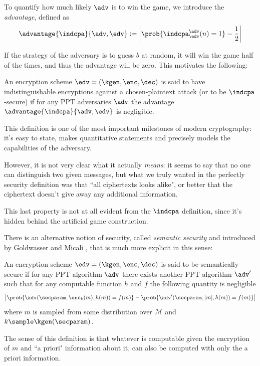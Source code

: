 To quantify how much likely $\adv$ is to win the game, we introduce the \emph{advantage}, defined as
$$\advantage{\indcpa}{\adv,\edv}:=\left| \prob{\indcpa^\adv_\edv(n)=1}-\frac12 \right|$$

If the strategy of the adversary is to guess $b$ at random, it will win the game half of the times, and thus the advantage will be zero. This motivates the following:

\begin{definition}
    An encryption scheme $\edv=(\kgen,\enc,\dec)$ is said to have indistinguishable encryptions against a chosen-plaintext attack (or to be $\indcpa$-secure) if for any PPT adversaries $\adv$ the advantage $\advantage{\indcpa}{\adv,\edv}$ is negligible.
\end{definition}

This definition is one of the most important milestones of modern cryptography: it's easy to state, makes quantitative statements and precisely models the capabilities of the adversary.

However, it is not very clear what it actually \emph{means}: it seems to say that no one can distinguish two given messages, but what we truly wanted in the perfectly security definition was that ``all ciphertexts looks alike", or better that the ciphertext doesn't give away any additional information.

This last property is not at all evident from the $\indcpa$ definition, since it's hidden behind the artificial game construction.

There is an alternative notion of security, called \emph{semantic security} and introduced by Goldwasser and Micali \cite{Goldwasser_ss}, that is much more explicit in this sense:
\begin{definition}
    An encryption scheme $\edv=(\kgen,\enc,\dec)$ is said to be semantically secure if for any PPT algorithm $\adv$ there exists another PPT algorithm $\adv'$ such that for any computable function $h$ and $f$ the following quantity is negligible
    $$\left| \prob{\adv(\secparam, \enc_k(m), h(m))=f(m)} - \prob{\adv'(\secparam, |m|, h(m))=f(m)}\right|$$
    where $m$ is sampled from some distribution over $\mathcal M$ and $k\sample\kgen(\secparam)$.
\end{definition}

The sense of this definition is that whatever is computable given the encryption of $m$ and ``a priori" information about it, can also be computed with only the a priori information.

